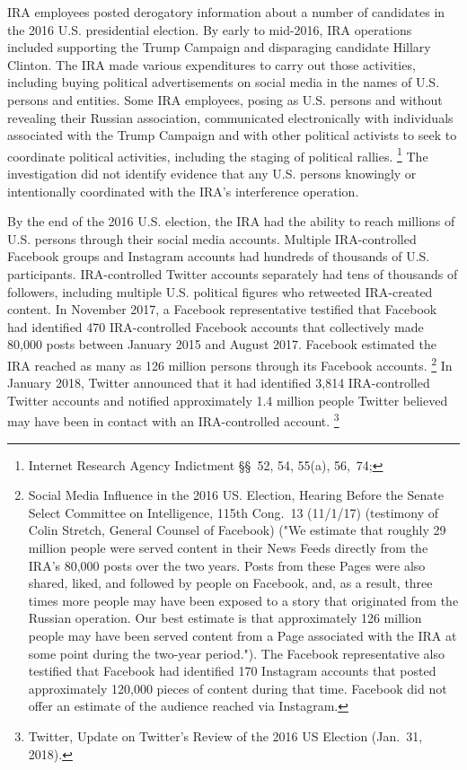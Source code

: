 IRA employees posted derogatory information about a  number of candidates in the 2016 U.S. presidential election.
By early to mid-2016, IRA operations included supporting the Trump Campaign and disparaging candidate Hillary Clinton.
The IRA made various expenditures to carry out those activities, including buying political advertisements on social media in the names of U.S. persons and entities.
Some IRA employees, posing as U.S. persons and without revealing their Russian association, communicated electronically with individuals associated with the Trump Campaign and with other political activists to seek to coordinate political activities, including the staging of political rallies.%
\footnote{Internet Research Agency Indictment \S\S~52, 54, 55(a), 56,~74; }
The investigation did not identify evidence that any U.S. persons knowingly or intentionally coordinated with the IRA's interference operation.

By the end of the 2016 U.S. election, the IRA had the ability to reach millions of U.S. persons through their social media accounts.
Multiple IRA-controlled Facebook groups and Instagram accounts had hundreds of thousands of U.S. participants.
IRA-controlled Twitter accounts separately had tens of thousands of followers, including multiple U.S. political figures who retweeted IRA-created content.
In November 2017, a Facebook representative testified that Facebook had identified 470 IRA-controlled Facebook accounts that collectively made 80,000 posts between January 2015 and August 2017.
Facebook estimated the IRA reached as many as 126 million persons through its Facebook accounts.%
\footnote{Social Media Influence in the 2016 US. Election, Hearing Before the Senate Select Committee on Intelligence, 115th Cong.~13 (11/1/17) (testimony of Colin Stretch, General Counsel of Facebook)
("We estimate that roughly 29 million people were served content in their News Feeds directly from the IRA's 80,000 posts over the two years.
Posts from these Pages were also shared, liked, and followed by people on Facebook, and, as a result, three times more people may have been exposed to a story that originated from the Russian operation.
Our best estimate is that approximately 126 million people may have been served content from a Page associated with the IRA at some point during the two-year period.").
The Facebook representative also testified that Facebook had identified 170 Instagram accounts that posted approximately 120,000 pieces of content during that time.
Facebook did not offer an estimate of the audience reached via Instagram.}
In January 2018, Twitter announced that it had identified 3,814 IRA-controlled Twitter accounts and notified approximately 1.4 million people Twitter believed may have been in contact with an IRA-controlled account.%
\footnote{Twitter, Update on Twitter's Review of the 2016 US Election (Jan.~31, 2018).}

